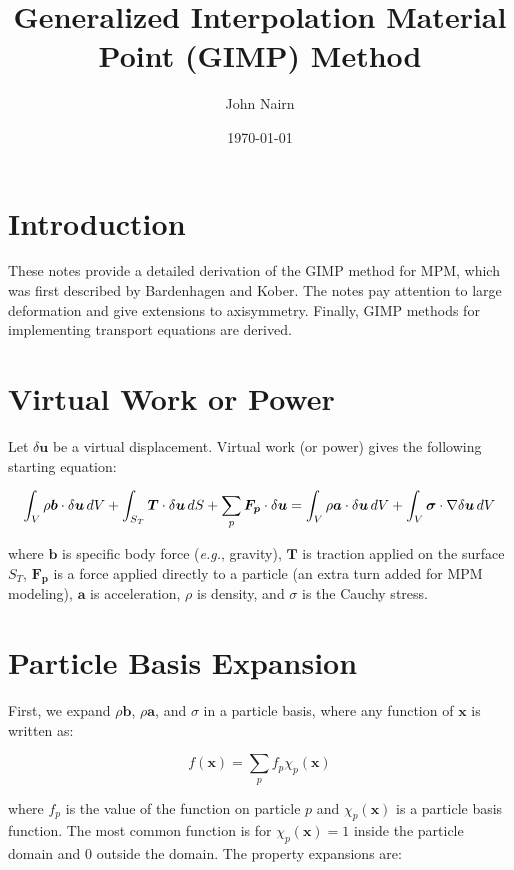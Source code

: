 \documentclass[11pt]{article}
\title{Generalized Interpolation Material Point (GIMP) Method}
\author{John Nairn}
\date{\today}
\renewcommand{\vec}[1]{\boldsymbol{#1}}
\newcommand{\tens}[1]{\boldsymbol{\mathsf{#1}}}
\begin{document}
\maketitle

\section{Introduction}

These notes provide a detailed derivation of the GIMP method for MPM, which was first described by Bardenhagen and Kober. The notes pay attention to large deformation and give extensions to axisymmetry. Finally, GIMP methods for implementing transport equations are derived.

\section{Virtual Work or Power}

Let $\delta\vec u$ be a virtual displacement. Virtual work (or power) gives the following starting equation:

\begin{equation}
\int_V \rho \vec b\cdot \delta\vec u\thinspace dV + \int_{S_T}\vec T \cdot \delta\vec u \thinspace dS + \sum_p \vec {F_p} \cdot \delta\vec u
    = \int_V \rho \vec a\cdot \delta\vec u\thinspace dV + \int_V \tens\sigma \cdot \nabla \delta\vec u\thinspace dV
\end{equation}

\noindent where $\vec b$ is specific body force ({\em e.g.}, gravity), $\vec T$ is traction applied on the surface $S_T$, $\vec {F_p}$ is a force applied directly to a particle (an extra turn added for MPM modeling), $\vec a$ is acceleration, $\rho$ is density, and $\tens\sigma$ is the Cauchy stress.

\section{Particle Basis Expansion}

First, we expand $\rho\vec b$, $\rho \vec a$, and $\tens\sigma$ in a particle basis, where any function of $\vec x$ is written as:

\begin{equation}
     f(\vec x) = \sum_p f_p \chi_p(\vec x)
\end{equation}

\noindent where $f_p$ is the value of the function on particle $p$ and $\chi_p(\vec x)$ is a particle basis function. The most common function is for $\chi_p(\vec x) =1$ inside the particle domain and $0$ outside the domain. The property expansions are:
\end{document}

